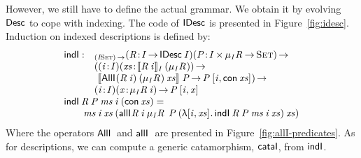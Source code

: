 \newcommand{\inductionI}{\F{indI}}
\newcommand{\cataI}{\F{cataI}}

However, we still have to define the actual grammar. We obtain it by
evolving $\Desc$ to cope with indexing.  The code of $\IDesc{\!}$ is presented in
Figure~\ref{fig:idesc}. Induction on indexed descriptions is defined
by:
%
\[\stk{
\begin{array}{@{}ll}
\inductionI : & _{\PI{\V{I}}{\Set}}
                   \PITEL{\V{R}}{\V{I} \To \IDesc{\V{I}}}
                   \PI{\V{P}}{\TIMES{\V{I}}{\IMu{\V{I}}{\V{R}}{\!}} \To \Set} \\
                 & (      \PITEL{\V{i}}{\V{I}} 
                          \PI{\V{xs}}{\idescop{\V{R}\: \V{i}}{\V{I}}{(\IMu{\V{I}}{\V{R}}{\!})}} \\
                 & \   \idescop{\AllI{}
                                     {(\V{R}\: \V{i})}
                                     {(\IMu{\V{I}}{\V{R}}{\!})}
                                     {\V{xs}}}
                               {}
                               {\V{P}} \To
                       \V{P}\: \pair{\V{i}}{\Con{\V{xs}}}{}) \To \\
                 & \PITEL{\V{i}}{\V{I}}
                   \PI{\V{x}}{\IMu{\V{I}}{\V{R}}{\V{i}}}
                   \V{P}\: \pair{\V{i}}{\V{x}}{}
\end{array} \\
\inductionI\: \V{R}\: \V{P}\: \V{ms}\: \V{i}\: (\Con{\V{xs}}) =  \\
\qquad
    \V{ms}\: \V{i}\: \V{xs}\: (\allI{}
                                    {\V{R}\: \V{i}}
                                    {\IMu{\V{I}}{\V{R}}{}}
                                    {\V{P}}
                                    {(\LAM{\pair{\V{i}}{\V{xs}}{}} \inductionI\: \V{R}\: \V{P}\: \V{ms}\: \V{i}\: \V{xs})}
                                    {\V{xs}})
}\]
%
Where the operators $\AllI{}{\!}{\!}{}$ and
$\allI{}{\!}{\!}{\!}{\!}{}$ are presented in
Figure~\ref{fig:allI-predicates}. As for descriptions, we can compute
a generic catamorphism, $\cataI$, from $\inductionI$.


